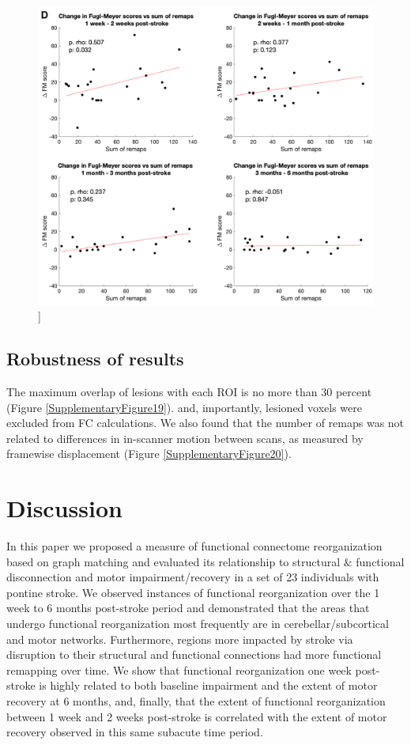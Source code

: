\documentclass[phd,tocprelim]{cornell}
\renewcommand{\caption}[1]{\singlespacing\hangcaption{#1}\normalspacing}
\begin{document}
\null
\vfill
\clearpage
\null
\vfill
\begin{figure}[h!]
		\ContinuedFloat
		\captionsetup{labelformat=adja-page}
    \centering
    \includegraphics[width=\textwidth]{chapter1/Figure5D.png}
    \caption[]{}
\end{figure}
\null
\vfill
\clearpage
	\subsection{Robustness of results}
	The maximum overlap of lesions with each ROI is no more than 30 percent (Figure \ref{SupplementaryFigure19}). and, importantly, lesioned voxels were excluded from FC calculations. We also found that the number of remaps was not related to differences in in-scanner motion between scans, as measured by framewise displacement (Figure \ref{SupplementaryFigure20}).

\section{Discussion}
	In this paper we proposed a measure of functional connectome reorganization based on graph matching and evaluated its relationship to structural $\&$ functional disconnection and motor impairment/recovery in a set of 23 individuals with pontine stroke. We observed instances of functional reorganization over the 1 week to 6 months post-stroke period and demonstrated that the areas that undergo functional reorganization most frequently are in cerebellar/subcortical and motor networks. Furthermore, regions more impacted by stroke via disruption to their structural and functional connections had more functional remapping over time.  We show that functional reorganization one week post-stroke is highly related to both baseline impairment and the extent of motor recovery at 6 months, and, finally, that the extent of functional reorganization between 1 week and 2 weeks post-stroke is correlated with the extent of motor recovery observed in this same subacute time period.
	
\end{document}
